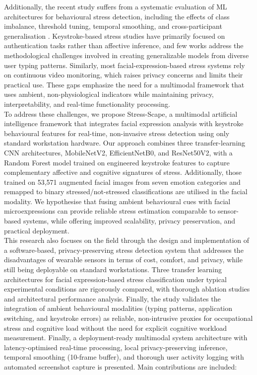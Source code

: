 \documentclass[fleqn,10pt]{wlscirep}
\begin{document}
Additionally, the recent study suffers from a systematic evaluation of ML architectures for behavioural stress detection, including the effects of class imbalance, threshold tuning, temporal smoothing, and cross-participant generalisation \cite{23paul2023parallelized}. Keystroke-based stress studies have primarily focused on authentication tasks rather than affective inference, and few works address the methodological challenges involved in creating generalizable models from diverse user typing patterns. Similarly, most facial-expression-based stress systems rely on continuous video monitoring, which raises privacy concerns and limits their practical use. These gaps emphasize the need for a multimodal framework that uses ambient, non-physiological indicators while maintaining privacy, interpretability, and real-time functionality processing.\\
To address these challenges, we propose Stress-Scape, a multimodal artificial intelligence framework that integrates facial expression analysis with keystroke behavioural features for real-time, non-invasive stress detection using only standard workstation hardware. Our approach combines three transfer-learning CNN architectures, MobileNetV2, EfficientNetB0, and ResNet50V2, with a Random Forest model trained on engineered keystroke features to capture complementary affective and cognitive signatures of stress. Additionally, those trained on 53,571 augmented facial images from seven emotion categories and remapped to binary stressed/not-stressed classifications are utilised in the facial modality. We hypothesise that fusing ambient behavioural cues with facial microexpressions can provide reliable stress estimation comparable to sensor-based systems, while offering improved scalability, privacy preservation, and practical deployment.\\ 
This research also focuses on the field through the design and implementation of a software-based, privacy-preserving stress detection system that addresses the disadvantages of wearable sensors in terms of cost, comfort, and privacy, while still being deployable on standard workstations. Three transfer learning architectures for facial expression-based stress classification under typical experimental conditions are rigorously compared, with thorough ablation studies and architectural performance analysis. Finally, the study validates the integration of ambient behavioural modalities (typing patterns, application switching, and keystroke errors) as reliable, non-intrusive proxies for occupational stress and cognitive load without the need for explicit cognitive workload measurement. Finally, a deployment-ready multimodal system architecture with latency-optimised real-time processing, local privacy-preserving inference, temporal smoothing (10-frame buffer), and thorough user activity logging with automated screenshot capture is presented. Main contributions are included:\\
\end{document}
